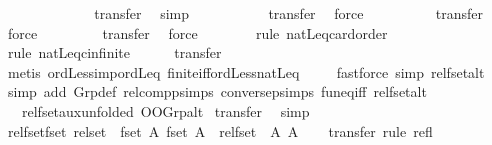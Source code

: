 \begin{isabellebody}
\ {\isacharminus}\isanewline
\ \ \ \ \ \ \ \ \ \ \isamarkupfalse%
\ transfer{\isacharprime}\ \isamarkupfalse%
\ simp\isanewline
\ \ \ \ \ \ \ \ \ \isamarkupfalse%
\ transfer{\isacharprime}\ \isamarkupfalse%
\ force\isanewline
\ \ \ \ \ \ \ \ \isamarkupfalse%
\ transfer\ \isamarkupfalse%
\ force\isanewline
\ \ \ \ \ \ \ \isamarkupfalse%
\ transfer{\isacharprime}\ \isamarkupfalse%
\ force\isanewline
\ \ \ \ \ \ \isamarkupfalse%
\ {\isacharparenleft}rule\ natLeq{\isacharunderscore}card{\isacharunderscore}order{\isacharparenright}\isanewline
\ \ \ \ \ \isamarkupfalse%
\ {\isacharparenleft}rule\ natLeq{\isacharunderscore}cinfinite{\isacharparenright}\isanewline
\ \ \ \ \isamarkupfalse%
\ transfer\ \isamarkupfalse%
\ {\isacharparenleft}metis\ ordLess{\isacharunderscore}imp{\isacharunderscore}ordLeq\ finite{\isacharunderscore}iff{\isacharunderscore}ordLess{\isacharunderscore}natLeq{\isacharparenright}\isanewline
\ \ \ \isamarkupfalse%
\ {\isacharparenleft}fastforce\ simp{\isacharcolon}\ rel{\isacharunderscore}fset{\isacharunderscore}alt{\isacharparenright}\isanewline
\ \isamarkupfalse%
\ {\isacharparenleft}simp\ add{\isacharcolon}\ Grp{\isacharunderscore}def\ relcompp{\isachardot}simps\ conversep{\isachardot}simps\ fun{\isacharunderscore}eq{\isacharunderscore}iff\ rel{\isacharunderscore}fset{\isacharunderscore}alt\isanewline
\ \ \ rel{\isacharunderscore}fset{\isacharunderscore}aux{\isacharbrackleft}unfolded\ OO{\isacharunderscore}Grp{\isacharunderscore}alt{\isacharbrackright}{\isacharparenright}\isanewline
{}\isamarkupfalse%
\ transfer\ \isamarkupfalse%
\ simp\isanewline
{}\isamarkupfalse%
%
\endisatagproof
{\isafoldproof}%
%
\isadelimproof
\isanewline
%
\endisadelimproof
\isanewline
{}\isamarkupfalse%
\ rel{\isacharunderscore}fset{\isacharunderscore}fset{\isacharcolon}\ {\isachardoublequoteopen}rel{\isacharunderscore}set\ {\isasymchi}\ {\isacharparenleft}fset\ A{}{\isacharparenright}\ {\isacharparenleft}fset\ A{}{\isacharparenright}\ {\isacharequal}\ rel{\isacharunderscore}fset\ {\isasymchi}\ A{}\ A{}{\isachardoublequoteclose}\isanewline
%
\isadelimproof
\ \ %
\endisadelimproof
%
\isatagproof
{}\isamarkupfalse%
\ transfer\ {\isacharparenleft}rule\ refl{\isacharparenright}%
\endisatagproof

\end{isabellebody}
